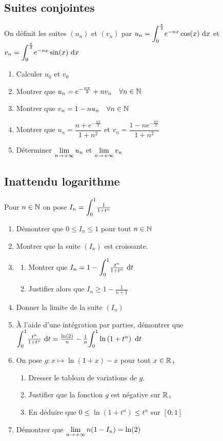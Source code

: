 \documentclass[oneside,12pt]{book}          %
\begin{document}
\subsection{Suites conjointes}
On définit les suites $(u_n)$ et $(v_n)$ par $u_n={\displaystyle\int_{0}^{\frac{\pi}{2}}}e^{-nx}\cos(x){\,\,\mathrm{d}} x$ et $v_n={\displaystyle\int_{0}^{\frac{\pi}{2}}}e^{-nx}\sin(x){\,\,\mathrm{d}} x$
\begin{enumerate}
    \item Calculer $u_0$ et $v_0$
    \item Montrer que $u_n=e^{-\frac{n\pi}{2}}+nv_n \quad \forall{n\in\mathbb N}$
    \item Montrer que $v_n=1-nu_n \quad \forall{n\in\mathbb N}$
    \item Montrer que $u_n=\dfrac{n+e^{-\frac{n\pi}{2}}}{1+n^2}$ et $v_n=\dfrac{1-ne^{-\frac{n\pi}{2}}}{1+n^2}$
    \item Déterminer ${\lim\limits_{n\to +\infty}}\, u_n$ et ${\lim\limits_{n\to +\infty}}\, v_n$
\end{enumerate}



\subsection{Inattendu logarithme}
Pour ${n\in\mathbb N}$ on pose $I_n={\displaystyle\int_{0}^{1}}\frac{1}{1+t^n}$
\begin{enumerate}
	\item Démontrer que $0\leq I_n\leq1$ pour tout ${n\in\mathbb N}$
	\item Montrer que la suite $(I_n)$ est croissante.
	\item \begin{enumerate}
		\item Montrer que $I_n=1-{\displaystyle\int_{0}^{1}}\frac{t^n}{1+t^n}{\,\,\mathrm{d}} t$
		\item Justifier alors que $I_n\geq1-\frac{1}{n+1}$
	\end{enumerate}	 
	\item Donner la limite de la suite $(I_n)$
	\item À l'aide d'une intégration par parties, démontrer que ${\displaystyle\int_{0}^{1}}\frac{t^n}{1+t^n}{\,\,\mathrm{d}} t = \frac{\ln(2)}{n}-\frac{1}{n}{\displaystyle\int_{0}^{1}}\ln\left(1+t^n\right){\,\,\mathrm{d}} t$
	\item On pose $g:x\mapsto\ln(1+x)-x$ pour tout ${x\in\mathbb R}_+$
	\begin{enumerate}
		\item Dresser le tableau de variations de $g$.
		\item Justifier que la fonction $g$ est négative sur ${\mathbb R}_+$
		\item En déduire que $0\leq\ln\left(1+t^n\right)\leq t^n$ sur $[0;1]$
	\end{enumerate}
	\item Démontrer que ${\lim\limits_{n\to +\infty}}\, n(1-I_n)=\ln(2)$
\end{enumerate}
\end{document}
